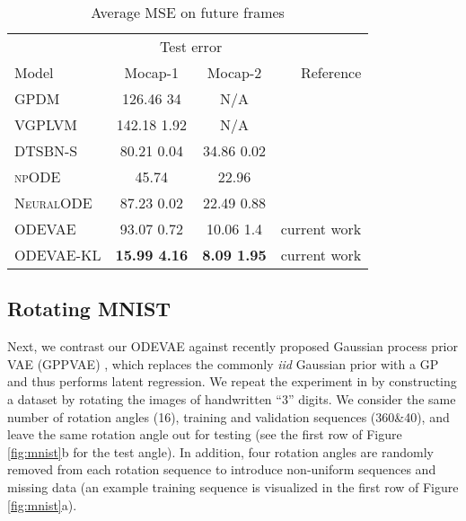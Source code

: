 \documentclass{article}
\newcommand{\0}{\mathbf{0}}
\begin{document}
\begin{table}[t]
	\caption{Average MSE on future frames}
	\label{tab:cmu}
	\vskip 0.15in
	\begin{center}
    \begin{small}
\begin{tabular}{lccr}
    	\toprule
    	       &  \multicolumn{2}{c}{Test error}   &  \\
    	       \cmidrule{2-3}
		 Model & Mocap-1 & Mocap-2 & Reference \\ 
	    \midrule
		 \textsc{GPDM} & 126.46  34 & N/A & \cite{wang2008gaussian} \\
		 \textsc{VGPLVM}  & 142.18  1.92 & N/A & \cite{damianou2011variational} \\
		 \textsc{DTSBN-S}  & 80.21  0.04 & 34.86  0.02 & \cite{gan2015deep}\\
		 \textsc{npODE} & 45.74 & 22.96 &  \cite{heinonen18a} \\
		 \textsc{NeuralODE} & 87.23  0.02 & 22.49  0.88 & \cite{chen2018neural} \\
		 ODEVAE & 93.07  0.72  & 10.06  1.4 & current work \\
		 ODEVAE-KL & \textbf{15.99  4.16} & \textbf{8.09  1.95} & current work\\
        \bottomrule
    \end{tabular}
\end{small}
    \end{center}
    \vskip -0.1in
\end{table}

\subsection{Rotating MNIST}
Next, we contrast our ODEVAE against recently proposed Gaussian process prior VAE (GPPVAE) \citep{casale2018gaussian}, which replaces the commonly \textit{iid} Gaussian prior with a GP and thus performs latent regression. We repeat the experiment in \cite{casale2018gaussian} by constructing a dataset by rotating the images of handwritten ``3'' digits. 
We consider the same number of rotation angles (16), training and validation sequences (360\&40), and leave the same rotation angle out for testing (see the first row of Figure \ref{fig:mnist}b for the test angle). 
In addition, four rotation angles are randomly removed from each rotation sequence to introduce non-uniform sequences and missing data (an example training sequence is visualized in the first row of Figure \ref{fig:mnist}a). 
\end{document}
